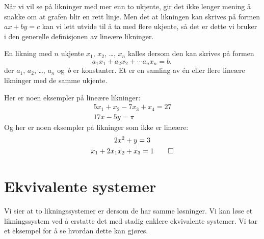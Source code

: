 Når vi vil se på likninger med mer enn to ukjente, gir det ikke lenger
mening å snakke om at grafen blir en rett linje.  Men det at likningen
kan skrives på formen $ax + by = c$ kan vi lett utvide til å ta med
flere ukjente, så det er dette vi bruker i den generelle definisjonen
av lineære likninger.

\begin{defn}
En likning med $n$ ukjente $x_1$, $x_2$, \ldots, $x_n$ kalles
 dersom den kan skrives på formen
\[
a_1 x_1 + a_2 x_2 + \cdots a_n x_n = b,
\]
der $a_1$, $a_2$, \ldots, $a_n$ og~$b$ er konstanter.  Et
 er en samling av én eller flere
lineære likninger med de samme ukjente.
\end{defn}


\begin{ex}
Her er noen eksempler på lineære likninger:
\begin{gather*}
5 x_1 + x_2 - 7 x_3 + x_4 = 27 \\
17 x - 5y = \pi
\end{gather*}
Og her er noen eksempler på likninger som ikke er lineære:
\begin{gather*}
2 x^2 + y = 3 \\
x_1 + 2 x_1 x_2 + x_3 = 1
\qedhere
\end{gather*}
\end{ex}


\section*{Ekvivalente systemer}

Vi sier at to likningssystemer er  dersom de har
samme løsninger.  Vi kan løse et likningssystem ved å erstatte det med
stadig enklere ekvivalente systemer.  Vi tar et eksempel for å se
hvordan dette kan gjøres.

